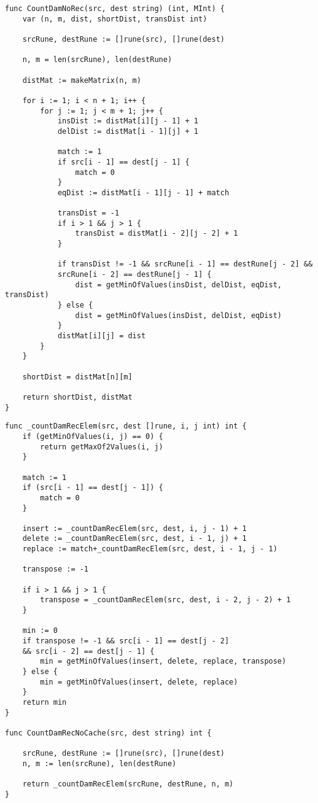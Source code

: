 \begin{lstlisting}[label=leven-recursive,caption=Программный код нахождения расстояния Дамерау\,--\,Левенштейна итеративно]
func CountDamNoRec(src, dest string) (int, MInt) {
	var (n, m, dist, shortDist, transDist int)
	
	srcRune, destRune := []rune(src), []rune(dest)
	
	n, m = len(srcRune), len(destRune)
	
	distMat := makeMatrix(n, m)
	
	for i := 1; i < n + 1; i++ {
		for j := 1; j < m + 1; j++ {
			insDist := distMat[i][j - 1] + 1
			delDist := distMat[i - 1][j] + 1
			
			match := 1
			if src[i - 1] == dest[j - 1] {
				match = 0
			}
			eqDist := distMat[i - 1][j - 1] + match
			
			transDist = -1
			if i > 1 && j > 1 {
				transDist = distMat[i - 2][j - 2] + 1
			}
			
			if transDist != -1 && srcRune[i - 1] == destRune[j - 2] && 
			srcRune[i - 2] == destRune[j - 1] {
				dist = getMinOfValues(insDist, delDist, eqDist, transDist)
			} else {
				dist = getMinOfValues(insDist, delDist, eqDist)
			}
			distMat[i][j] = dist
		}
	}
	
	shortDist = distMat[n][m]
	
	return shortDist, distMat
}
\end{lstlisting}

\begin{lstlisting}[label=damer-lev-iter,caption=Программный код нахождения расстояния Дамерау\,--\,Левенштейна рекурсивно]
func _countDamRecElem(src, dest []rune, i, j int) int {
	if (getMinOfValues(i, j) == 0) {
		return getMaxOf2Values(i, j)
	}
	
	match := 1
	if (src[i - 1] == dest[j - 1]) {
		match = 0
	}
	
	insert := _countDamRecElem(src, dest, i, j - 1) + 1
	delete := _countDamRecElem(src, dest, i - 1, j) + 1
	replace := match+_countDamRecElem(src, dest, i - 1, j - 1)
	
	transpose := -1
	
	if i > 1 && j > 1 {
		transpose = _countDamRecElem(src, dest, i - 2, j - 2) + 1
	}
	
	min := 0
	if transpose != -1 && src[i - 1] == dest[j - 2] 
	&& src[i - 2] == dest[j - 1] {
		min = getMinOfValues(insert, delete, replace, transpose)
	} else {
		min = getMinOfValues(insert, delete, replace)
	}
	return min
}

func CountDamRecNoCache(src, dest string) int {
	
	srcRune, destRune := []rune(src), []rune(dest)
	n, m := len(srcRune), len(destRune)
	
	return _countDamRecElem(srcRune, destRune, n, m)
}
\end{lstlisting}

